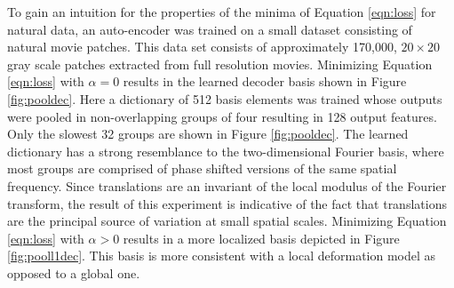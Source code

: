 To gain an intuition for the properties of the minima of Equation
\ref{eqn:loss} for natural data, an auto-encoder was trained on a small dataset
consisting of natural movie patches. This data set consists of approximately
170,000, $20 \times 20$ gray scale patches extracted from full resolution
movies.  Minimizing Equation \ref{eqn:loss} with $\alpha=0$ results in the
learned decoder basis shown in Figure \ref{fig:pooldec}. Here a dictionary of
512 basis elements was trained whose outputs were pooled in non-overlapping
groups of four resulting in 128 output features. Only the slowest 32 groups are
shown in Figure \ref{fig:pooldec}. The learned dictionary has a strong
resemblance to the two-dimensional Fourier basis, where most groups are
comprised of phase shifted versions of the same spatial frequency. Since
translations are an invariant of the local modulus of the Fourier transform,
the result of this experiment is indicative of the fact that translations are
the principal source of variation at small spatial scales. Minimizing Equation
\ref{eqn:loss} with $\alpha > 0$ results in a more localized basis depicted in
Figure \ref{fig:pooll1dec}. This basis is more consistent with a local
deformation model as opposed to a global one. 

